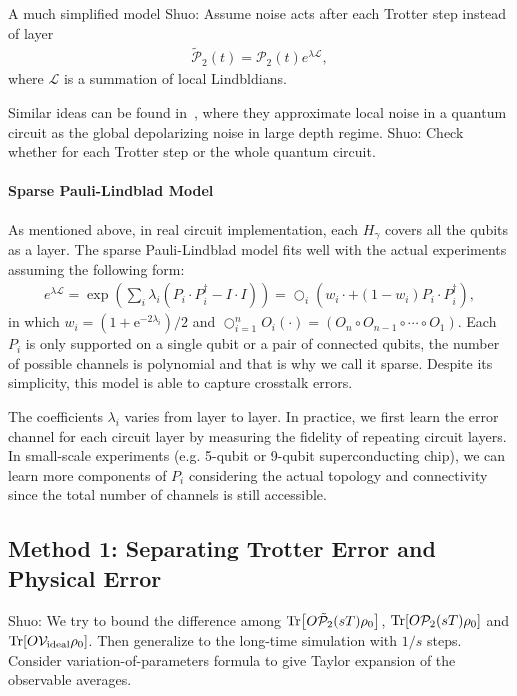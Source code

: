 \documentclass[11pt]{article}
\renewcommand{\L}{\mathcal{L}}
\renewcommand{\P}{\mathcal{P}}
\newcommand{\sz}[1]{{\color{blue} Shuo: #1}}
\begin{document}
A much simplified model \sz{Assume noise acts after each Trotter step instead of layer}
\begin{align*}
\tilde{\P}_2(t)=\P_2(t)e^{\lambda \L},
\end{align*}
where $\L$ is a summation of local Lindbldians.

Similar ideas can be found in~\cite{hakkaku2025dataefficienterrormitigationphysical}, where they approximate local noise in a quantum circuit as the global depolarizing noise in large depth regime. \sz{Check whether for each Trotter step or the whole quantum circuit.}
\paragraph{Sparse Pauli-Lindblad Model}
As mentioned above, in real circuit implementation, each $H_\gamma$ covers all the qubits as a layer. The sparse Pauli-Lindblad model fits well with the actual experiments assuming the following form:
\begin{align*}
    e^{\lambda\L} = \exp(\sum_i\lambda_i(P_i\cdot P_i^\dagger- I\cdot I )) =\bigcirc_i\left(w_i \cdot+\left(1-w_i\right) P_i \cdot P_i^{\dagger}\right),
\end{align*}
in which $w_i=\left(1+\mathrm{e}^{-2 \lambda_i}\right) / 2$ and $\bigcirc_{i=1}^n O_i(\cdot)=\left(O_n \circ O_{n-1} \circ \cdots \circ O_1\right)$. Each $P_i$ is only supported on a single qubit or a pair of connected 
qubits, the number of possible channels is polynomial and that is why we call it sparse. Despite its simplicity, this model is able to capture crosstalk errors.

The coefficients $\lambda_i$ varies from layer to layer. In practice, we first learn the error channel for each circuit layer by measuring the fidelity of repeating circuit layers. In small-scale experiments (e.g. 5-qubit or 9-qubit superconducting chip), we can learn more components of $P_i$ considering the actual topology and connectivity since the total number of channels is still accessible.

\subsection{Method 1: Separating Trotter Error and Physical Error}
\sz{We try to bound the difference among $\Tr[O\tilde{\P}_2(sT)\rho_0]$, $\Tr[O\P_2(sT)\rho_0]$ and $\Tr[O\mathcal{V_{\text{ideal}}}\rho_0]$. Then generalize to the long-time simulation with $1/s$ steps. Consider variation-of-parameters formula to give Taylor expansion of the observable averages.}
\end{document}
